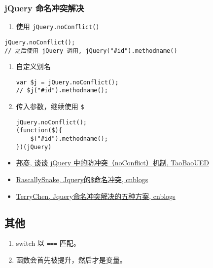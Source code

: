 \subsubsection{jQuery
命名冲突解决}\label{jquery-ux547dux540dux51b2ux7a81ux89e3ux51b3}

\begin{enumerate}
\def\labelenumi{\arabic{enumi}.}
\tightlist
\item
  使用 \lstinline!jQuery.noConflict()!
\end{enumerate}

\begin{lstlisting}
jQuery.noConflict();
// 之后使用 jQuery 调用, jQuery("#id").methodname()
\end{lstlisting}

\begin{enumerate}
\def\labelenumi{\arabic{enumi}.}
\setcounter{enumi}{1}
\item
  自定义别名

\begin{lstlisting}
var $j = jQuery.noConflict();
// $j("#id").methodname();
\end{lstlisting}
\item
  传入参数，继续使用 \lstinline!$!

\begin{lstlisting}
jQuery.noConflict();
(function($){
    $("#id").methodname();
})(jQuery)
\end{lstlisting}
\end{enumerate}

\begin{itemize}
\tightlist
\item
  \href{http://ued.taobao.org/blog/2013/03/jquery-noconflict/}{邦彦,
  谈谈 jQuery 中的防冲突（noConflict）机制, TaoBaoUED}
\item
  \href{http://www.cnblogs.com/RascallySnake/archive/2010/05/07/1729417.html}{RascallySnake,
  Jquery的\$命名冲突, cnblogs}
\item
  \href{http://www.cnblogs.com/ForEvErNoME/archive/2012/03/15/2398659.html}{TerryChen,
  Jquery命名冲突解决的五种方案, cnblogs}
\end{itemize}

\subsection{其他}\label{ux5176ux4ed6}

\begin{enumerate}
\def\labelenumi{\arabic{enumi}.}
\tightlist
\item
  switch 以 \lstinline!===! 匹配。
\item
  函数会首先被提升，然后才是变量。
\end{enumerate}

